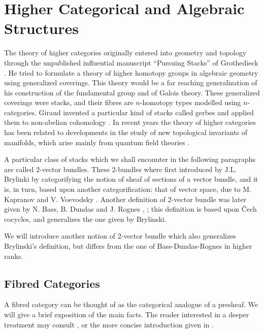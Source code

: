 \section{Higher Categorical and Algebraic Structures}

The theory of higher categories originally entered into geometry and topology through the unpublished influential manuscript ``Pursuing Stacks'' of Grothedieck \cite{grothendieck:_pursuin}.  He tried to formulate a theory of higher homotopy groups in algebraic geometry using generalized coverings. This theory would be a far reaching generalization of his construction of the fundamental group \cite{kn:grothendieck2} and of Galois theory. These generalized coverings were stacks, and their fibres are $n$-homotopy types modelled using $n$-categories.
Giraud invented a particular kind of stacks called gerbes and applied them to non-abelian cohomology \cite{kn:giraud}.
In recent years the theory of higher categories has been related to developments in the study of new topological invariants of manifolds, which arise mainly from quantum field theories \cite{yetter:_cla}. 
 
A particular class of stacks which we shall encounter in the following paragraphs are called 2-vector bundles. These 2-bundles where first introduced by J.L. Brylinki \cite{brylinsky:_categ_vector_bundl_yang_mill} by categorifying the notion of sheaf of sections of a vector bundle, and it is, in turn, based upon another categorification: that of vector space, due to M. Kapranov and V. Voevodsky \cite{kn:kv}. Another definition of 2-vector bundle was later given by N. Bass, B. Dundas and J. Rognes \cite{bdr:_2vb}, \cite{BDRR:2vb_ell}; this definition is based upon {\v C}ech cocycles, and generalizes the one given by Brylinski.

We will introduce another notion of 2-vector bundle which also generalizes Brylinski's definition, but differs from the one of Bass-Dundas-Rognes in higher ranks.

\subsection{Fibred Categories}

A fibred category can be thought of as the categorical analogue of a presheaf. We will give a brief exposition of the main facts. The reader interested in a deeper treatment may consult \cite{kn:grothendieck2}, \cite{Vistoli:descent} or the more concise introduction given in \cite{Moerdijk:stacks}.

